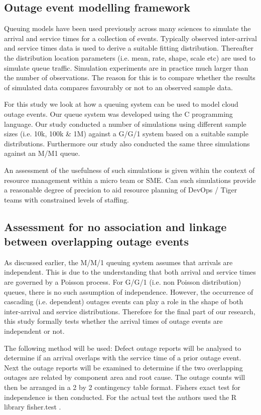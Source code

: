 \documentclass[5p]{elsarticle}
\begin{document}
\subsection{Outage event modelling framework}

Queuing models have been used previously across many sciences to simulate the arrival and service times for a collection of events. Typically observed inter-arrival and service times data is used to derive a suitable fitting distribution. Thereafter the distribution location parameters (i.e. mean, rate, shape, scale etc) are used to simulate queue traffic. Simulation experiments are in practice much larger than the number of observations. The reason for this is to compare whether the results of simulated data compares favourably or not to an observed sample data. 

For this study we look at how a queuing system can be used to model cloud outage events. Our queue system was developed using the C programming language. Our study conducted a number of simulations using different sample sizes (i.e. 10k, 100k \& 1M) against a G/G/1 system based on a suitable sample distributions. Furthermore our study also conducted the same three simulations against an M/M1 queue. 

An assessment of the usefulness of such simulations is given within the context of resource management within a micro team or SME. Can such simulations provide a reasonable degree of precision to aid resource planning of DevOps / Tiger teams with constrained levels of staffing.

\subsection{Assessment for no association and linkage between overlapping outage events}

As discussed earlier, the M/M/1 queuing system assumes that arrivals are independent. This is due to the understanding that both arrival and service times are governed by a Poisson process. For G/G/1 (i.e. non Poisson distribution) queues, there is no such assumption of independence. However, the occurrence of cascading (i.e. dependent) outages events can play a role in the shape of both inter-arrival and service distributions. Therefore for the final part of our research, this study formally tests whether the arrival times of outage events are independent or not. 

The following method will be used: Defect outage reports will be analysed to determine if an arrival overlaps with the service time of a prior outage event. Next the outage reports will be examined to determine if the two overlapping outages are related by component area and root cause. The outage counts will then be arranged in a 2 by 2 contingency table format. Fishers exact test for independence\cite{fisher1922interpretation}\cite{fisher1925statistical} is then conducted. For the actual test the authors used the R library fisher.test \cite{FisherExact}. 
\end{document}
